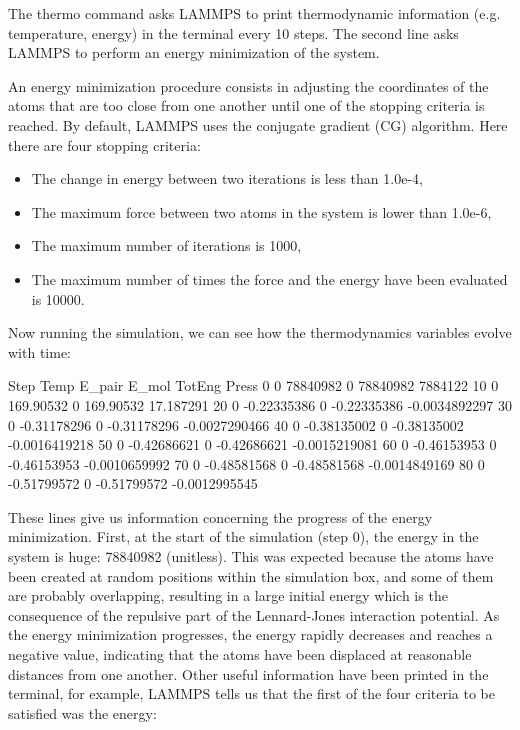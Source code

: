 \noindent The thermo command asks LAMMPS to print
thermodynamic information (e.g. temperature, energy) in the
terminal every 10 steps. The second line asks LAMMPS to
perform an energy minimization of the system.

\begin{tcolorbox}[colback=mylightblue!5!white,colframe=mylightblue!75!black,title=About energy minimization]
An energy minimization procedure consists in adjusting
the coordinates of the atoms that are too close from one another until one of the stopping
criteria is reached. By default, LAMMPS uses the conjugate gradient (CG) algorithm.
Here there are four stopping criteria:
\begin{itemize}
\item The change in energy between two iterations is less than 1.0e-4,
\item The maximum force between two atoms in the system is lower than 1.0e-6,
\item The maximum number of iterations is 1000,
\item The maximum number of times the force and the energy have been evaluated is 10000.
\end{itemize}
\end{tcolorbox}

Now running the simulation, we can see how the thermodynamics
variables evolve with time:

\begin{lcverbatim}
Step Temp         E_pair  E_mol       TotEng         Press
0       0       78840982      0     78840982       7884122 
10      0      169.90532      0    169.90532     17.187291 
20      0    -0.22335386      0  -0.22335386 -0.0034892297 
30      0    -0.31178296      0  -0.31178296 -0.0027290466 
40      0    -0.38135002      0  -0.38135002 -0.0016419218 
50      0    -0.42686621      0  -0.42686621 -0.0015219081 
60      0    -0.46153953      0  -0.46153953 -0.0010659992 
70      0    -0.48581568      0  -0.48581568 -0.0014849169 
80      0    -0.51799572      0  -0.51799572 -0.0012995545 
\end{lcverbatim}

\noindent These lines give us information concerning
the progress of the energy minimization. First, at the start
of the simulation (step 0), the energy in the system is
huge: 78840982 (unitless). This was expected because
the atoms have been created at random positions within the
simulation box, and some of them are probably overlapping,
resulting in a large initial energy which is the consequence
of the repulsive part of the Lennard-Jones interaction
potential. As the energy minimization progresses, the energy
rapidly decreases and reaches a negative value, indicating that the atoms have been
displaced at reasonable distances from one another. Other
useful information have been printed in the terminal, for
example, LAMMPS tells us that the first of the four criteria
to be satisfied was the energy:

